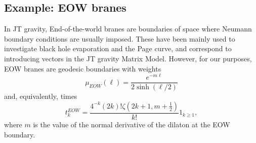 \documentclass[a4paper,11pt]{article}
\newcommand{\rmd}{\mathrm{d}}
\begin{document}
\subsection{Example: EOW branes}
In JT gravity, End-of-the-world branes are boundaries of space where Neumann boundary conditions are usually imposed. These have been mainly used to investigate black hole evaporation and the Page curve\cite{Penington:2019kki}, and correspond to introducing vectors in the JT gravity Matrix Model. However, for our purposes, EOW branes are geodesic boundaries with weights \cite{Gao:2021uro}
\begin{equation}
    \mu_
{EOW}(\ell)=\frac{e^{-m\ell}}{2\sinh{\left(\ell/2\right)}}
\end{equation}
and, equivalently, times 
\begin{equation}
    t^{EOW}_k=\frac{4^{-k}(2k)! \zeta \left(2 k+1,m+\frac{1}{2}\right)}{k!} \mathrm{1}_{k\geq 1},
\end{equation}
where $m$ is the value of the normal derivative of the dilaton at the EOW boundary.

\end{document}
